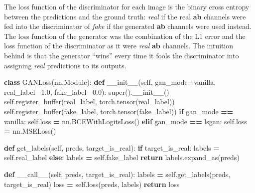 \documentclass[
]{article}
\newenvironment{Shaded}{\begin{snugshade}}{\end{snugshade}}
\newcommand{\BuiltInTok}[1]{#1}
\newcommand{\ControlFlowTok}[1]{\textcolor[rgb]{0.13,0.29,0.53}{\textbf{#1}}}
\newcommand{\FloatTok}[1]{\textcolor[rgb]{0.00,0.00,0.81}{#1}}
\newcommand{\FunctionTok}[1]{\textcolor[rgb]{0.00,0.00,0.00}{#1}}
\newcommand{\KeywordTok}[1]{\textcolor[rgb]{0.13,0.29,0.53}{\textbf{#1}}}
\newcommand{\NormalTok}[1]{#1}
\newcommand{\OperatorTok}[1]{\textcolor[rgb]{0.81,0.36,0.00}{\textbf{#1}}}
\newcommand{\StringTok}[1]{\textcolor[rgb]{0.31,0.60,0.02}{#1}}
\newcommand{\VariableTok}[1]{\textcolor[rgb]{0.00,0.00,0.00}{#1}}
\begin{document}
The loss function of the discriminator for each image is the binary
cross entropy between the predictions and the ground truth: \emph{real}
if the real \textbf{ab} channels were fed into the discriminator of
\emph{fake} if the generated \textbf{ab} channels were used instead. The
loss function of the generator was the combination of the L1 error and
the loss function of the discriminator as it were \emph{real}
\textbf{ab} channels. The intuition behind is that the generator
``wins'' every time it fools the discriminator into assigning
\emph{real} predictions to its outputs.

\begin{Shaded}
\begin{Highlighting}[]
\KeywordTok{class}\NormalTok{ GANLoss(nn.Module):}
    \KeywordTok{def} \FunctionTok{\_\_init\_\_}\NormalTok{(}\VariableTok{self}\NormalTok{, gan\_mode}\OperatorTok{=}\StringTok{\textquotesingle{}vanilla\textquotesingle{}}\NormalTok{, real\_label}\OperatorTok{=}\FloatTok{1.0}\NormalTok{, fake\_label}\OperatorTok{=}\FloatTok{0.0}\NormalTok{):}
        \BuiltInTok{super}\NormalTok{().}\FunctionTok{\_\_init\_\_}\NormalTok{()}
        \VariableTok{self}\NormalTok{.register\_buffer(}\StringTok{\textquotesingle{}real\_label\textquotesingle{}}\NormalTok{, torch.tensor(real\_label))}
        \VariableTok{self}\NormalTok{.register\_buffer(}\StringTok{\textquotesingle{}fake\_label\textquotesingle{}}\NormalTok{, torch.tensor(fake\_label))}
        \ControlFlowTok{if}\NormalTok{ gan\_mode }\OperatorTok{==} \StringTok{\textquotesingle{}vanilla\textquotesingle{}}\NormalTok{:}
            \VariableTok{self}\NormalTok{.loss }\OperatorTok{=}\NormalTok{ nn.BCEWithLogitsLoss()}
        \ControlFlowTok{elif}\NormalTok{ gan\_mode }\OperatorTok{==} \StringTok{\textquotesingle{}lsgan\textquotesingle{}}\NormalTok{:}
            \VariableTok{self}\NormalTok{.loss }\OperatorTok{=}\NormalTok{ nn.MSELoss()}
    
    \KeywordTok{def}\NormalTok{ get\_labels(}\VariableTok{self}\NormalTok{, preds, target\_is\_real):}
        \ControlFlowTok{if}\NormalTok{ target\_is\_real:}
\NormalTok{            labels }\OperatorTok{=} \VariableTok{self}\NormalTok{.real\_label}
        \ControlFlowTok{else}\NormalTok{:}
\NormalTok{            labels }\OperatorTok{=} \VariableTok{self}\NormalTok{.fake\_label}
        \ControlFlowTok{return}\NormalTok{ labels.expand\_as(preds)}
    
    \KeywordTok{def} \FunctionTok{\_\_call\_\_}\NormalTok{(}\VariableTok{self}\NormalTok{, preds, target\_is\_real):}
\NormalTok{        labels }\OperatorTok{=} \VariableTok{self}\NormalTok{.get\_labels(preds, target\_is\_real)}
\NormalTok{        loss }\OperatorTok{=} \VariableTok{self}\NormalTok{.loss(preds, labels) }
        \ControlFlowTok{return}\NormalTok{ loss}
\end{Highlighting}
\end{Shaded}
\end{document}
